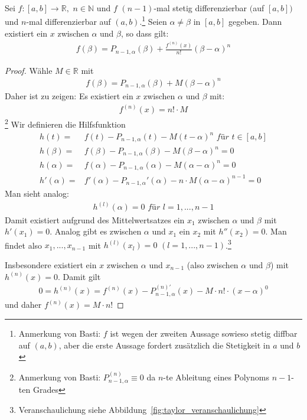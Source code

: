 \begin{Satz}{\label{satz_von_taylor}
	Sei $f: [a,b] \rightarrow \mathbb{R},$ $n \in \mathbb{N}$ und 
	$f$ $(n-1)$-mal stetig differenzierbar $($auf $[a,b])$ und 
	$n$-mal differenzierbar auf $(a,b)$.\footnote{Anmerkung von Basti: $f$ ist wegen der zweiten Aussage sowieso stetig diffbar auf $(a,b)$, aber die erste Aussage fordert zusätzlich die Stetigkeit in $a$ und $b$} Seien $\alpha \neq \beta$ 
	in $[a,b]$ gegeben. Dann existiert ein $x$ zwischen $\alpha$ 
	und $\beta$, so dass gilt: 
	\begin{align*}
		f(\beta) = P_{n-1, \alpha}(\beta) + \frac{f^{(n)}(x)}{n!}(\beta - \alpha)^n
	\end{align*}
}\end{Satz}

\begin{proof}
	Wähle $M \in \mathbb{R}$ mit 
	\begin{align*}
		f(\beta) = P_{n-1,\alpha}(\beta) + M (\beta - \alpha)^n
	\end{align*}
	Daher ist zu zeigen: Es existiert ein $x$ zwischen $\alpha$ und $\beta$ mit:
	\begin{align*}
		f^{(n)}(x) = n! \cdot M
	\end{align*}\footnote{Anmerkung von Basti: $P_{n-1, \alpha}^{(n)} \equiv 0$ da $n$-te Ableitung eines Polynoms $n-1$-ten Grades}
	Wir definieren die Hilfsfunktion 
	\begin{align*}
		h(t) = & f(t) - P_{n-1, \alpha}(t) - M(t - \alpha)^n 
		\textit{ für } t \in [a,b] \\
		h(\beta) = & f(\beta) - P_{n-1, \alpha}(\beta) - M(\beta- \alpha)^n = 0 \\
		h(\alpha) = & f(\alpha) - P_{n-1, \alpha}(\alpha) -
		M(\alpha -\alpha)^n = 0 
		\tag{siehe obige Bemerekung} \\
		h'(\alpha) = & f'(\alpha) - P_{n-1, \alpha}'(\alpha) - 
		n \cdot M(\alpha - \alpha)^{n-1} = 0
	\end{align*} 
	Man sieht analog:
	\begin{align*}
		h^{(l)}(\alpha) = 0 \textit{ für } l = 1, ..., n-1
	\end{align*}
	Damit existiert aufgrund des Mittelwertsatzes ein $x_1$ zwischen $\alpha$ und 
	$\beta$ mit $h'(x_1) = 0$. Analog gibt es zwischen $\alpha$ und 
	$x_1$ ein $x_2$ mit $h''(x_2) = 0$. Man findet also $x_1, ..., x_{n-1}$ mit 
	$h^{(l)}(x_l) = 0$ $( l = 1, ..., n-1)$.\footnote{Veranschaulichung siehe Abbildung~\ref{fig:taylor_veranschaulichung}}

	Insbesondere existiert ein $x$ 
	zwischen $\alpha$ und $x_{n-1}$ (also zwischen $\alpha$ und $\beta$) mit 
	$h^{(n)}(x) = 0$. Damit gilt 
	\begin{align*}
		0 = h^{(n)}(x) = f^{(n)}(x) - P^{(n)'}_{n-1, \alpha}(x) - M \cdot n! \cdot 
		(x-\alpha)^0
	\end{align*}{}
	und daher $f^{(n)}(x) = M \cdot n!$
\end{proof}	

